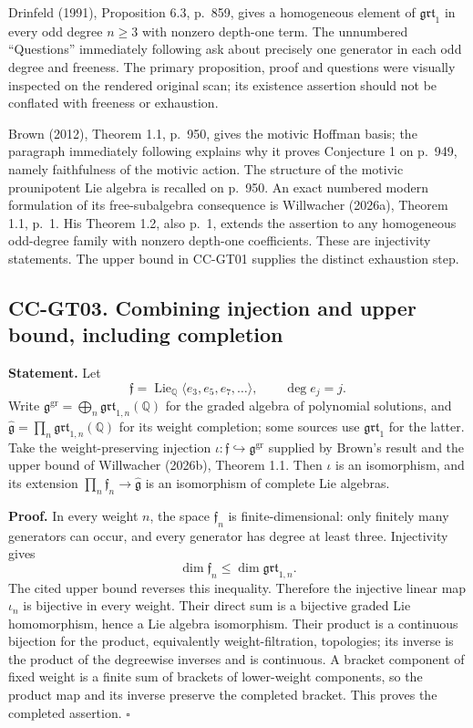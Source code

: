 \documentclass[11pt,a4paper]{article}
\theoremstyle{definition}\newtheorem{definition}[theorem]{Definition}
\theoremstyle{remark}\newtheorem{remark}[theorem]{Remark}
\begin{document}
Drinfeld (1991), Proposition 6.3, p.~859, gives a homogeneous element of
\(\mathfrak{grt}_1\) in every odd degree \(n\ge3\) with nonzero
depth-one term. The unnumbered ``Questions'' immediately following ask
about precisely one generator in each odd degree and freeness. The
primary proposition, proof and questions were visually inspected on the
rendered original scan; its existence assertion should not be conflated
with freeness or exhaustion.

Brown (2012), Theorem 1.1, p.~950, gives the motivic Hoffman basis; the
paragraph immediately following explains why it proves Conjecture 1 on
p.~949, namely faithfulness of the motivic action. The structure of the
motivic prounipotent Lie algebra is recalled on p.~950. An exact
numbered modern formulation of its free-subalgebra consequence is
Willwacher (2026a), Theorem 1.1, p.~1. His Theorem 1.2, also p.~1,
extends the assertion to any homogeneous odd-degree family with nonzero
depth-one coefficients. These are injectivity statements. The upper
bound in CC-GT01 supplies the distinct exhaustion step.

\subsection{CC-GT03. Combining injection and upper bound, including
completion}\label{cc-gt03.-combining-injection-and-upper-bound-including-completion}

\textbf{Statement.} Let \[
 \mathfrak f=\operatorname{Lie}_{\mathbb Q}\langle e_3,e_5,e_7,\ldots\rangle,
 \qquad \deg e_j=j.
\] Write
\(\mathfrak g^{\mathrm{gr}}=\bigoplus_n\mathfrak{grt}_{1,n}(\mathbb Q)\)
for the graded algebra of polynomial solutions, and
\(\widehat{\mathfrak g}=\prod_n\mathfrak{grt}_{1,n}(\mathbb Q)\) for its
weight completion; some sources use \(\mathfrak{grt}_1\) for the latter.
Take the weight-preserving injection
\(\iota:\mathfrak f\hookrightarrow\mathfrak g^{\mathrm{gr}}\) supplied
by Brown's result and the upper bound of Willwacher (2026b), Theorem
1.1. Then \(\iota\) is an isomorphism, and its extension
\(\prod_n\mathfrak f_n\to\widehat{\mathfrak g}\) is an isomorphism of
complete Lie algebras.

\textbf{Proof.} In every weight \(n\), the space \(\mathfrak f_n\) is
finite-dimensional: only finitely many generators can occur, and every
generator has degree at least three. Injectivity gives \[
 \dim\mathfrak f_n\le\dim\mathfrak{grt}_{1,n}.
\] The cited upper bound reverses this inequality. Therefore the
injective linear map \(\iota_n\) is bijective in every weight. Their
direct sum is a bijective graded Lie homomorphism, hence a Lie algebra
isomorphism. Their product is a continuous bijection for the product,
equivalently weight-filtration, topologies; its inverse is the product
of the degreewise inverses and is continuous. A bracket component of
fixed weight is a finite sum of brackets of lower-weight components, so
the product map and its inverse preserve the completed bracket. This
proves the completed assertion. \(\square\)
\end{document}
